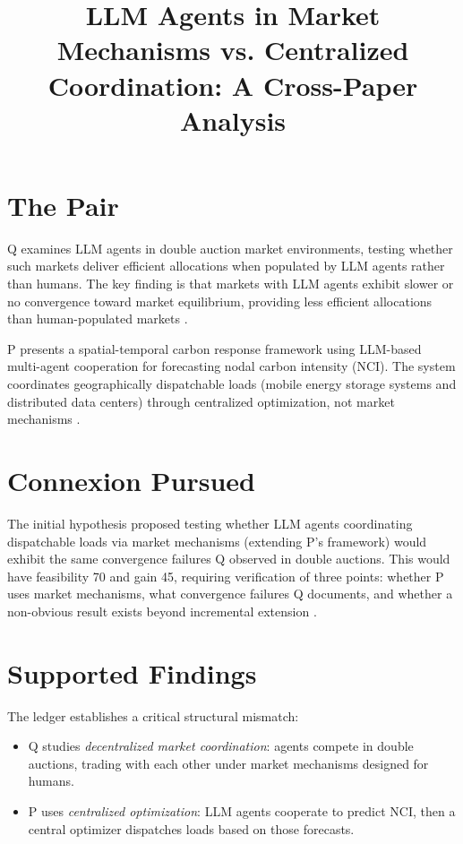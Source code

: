 \documentclass{article}
\title{LLM Agents in Market Mechanisms vs. Centralized Coordination: A Cross-Paper Analysis}
\begin{document}
\maketitle

\section{The Pair}

Q examines LLM agents in double auction market environments, testing whether such markets deliver efficient allocations when populated by LLM agents rather than humans. The key finding is that markets with LLM agents exhibit slower or no convergence toward market equilibrium, providing less efficient allocations than human-populated markets .

P presents a spatial-temporal carbon response framework using LLM-based multi-agent cooperation for forecasting nodal carbon intensity (NCI). The system coordinates geographically dispatchable loads (mobile energy storage systems and distributed data centers) through centralized optimization, not market mechanisms .

\section{Connexion Pursued}

The initial hypothesis proposed testing whether LLM agents coordinating dispatchable loads via market mechanisms (extending P's framework) would exhibit the same convergence failures Q observed in double auctions. This would have feasibility 70 and gain 45, requiring verification of three points: whether P uses market mechanisms, what convergence failures Q documents, and whether a non-obvious result exists beyond incremental extension .

\section{Supported Findings}

The ledger establishes a critical structural mismatch:

\begin{itemize}
  \item Q studies \textit{decentralized market coordination}: agents compete in double auctions, trading with each other under market mechanisms designed for humans.
  \item P uses \textit{centralized optimization}: LLM agents cooperate to predict NCI, then a central optimizer dispatches loads based on those forecasts.
\end{itemize}
\end{document}
